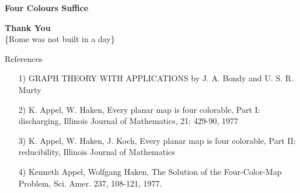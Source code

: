 \documentclass[12pt]{beamer}
\begin{document}
\begin{frame}
\LARGE{\textbf{Four Colours Suffice}}
\end{frame}


\begin{frame}
\centering
\textbf{\LARGE{Thank You}}\\
\{Rome was not built in a day\}
\end{frame}

\begin{frame}{References}
\begin{itemize}
\item[1)]GRAPH THEORY WITH APPLICATIONS by J. A. Bondy and U. S. R. Murty
\item[2)] K. Appel, W. Haken, Every planar map is four colorable, Part I: discharging, Illinois Journal of Mathematics, 21: 429-90, 1977
\item[3)] K. Appel, W. Haken, J. Koch, Every planar map is four colorable, Part II:
reducibility, Illinois Journal of Mathematics
\item[4)]Kenneth Appel, Wolfgang Haken, The Solution of the Four-Color-Map
Problem, Sci. Amer. 237, 108-121, 1977.

\end{itemize}
\end{frame}
\end{document}
